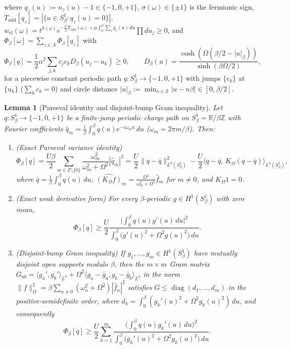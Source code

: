 \documentclass[11pt]{article}
\newtheorem{lemma}[theorem]{Lemma}
\theoremstyle{definition}
\theoremstyle{remark}
\DeclareMathOperator{\diag}{diag}
\newcommand{\R}{\mathbb{R}}
\newcommand{\Z}{\mathbb{Z}}
\begin{document}
where $q_z(u) := n_z(u) - 1 \in \{-1,0,+1\}$, $\sigma(\omega) \in \{\pm 1\}$ is
the fermionic sign, $T_{\mathrm{odd}}[q_z] = |\{u \in S^1_\beta : q_z(u) = 0\}|$,
$w_{\mathrm{el}}(\omega) = t^{h(\omega)} e^{-\frac{U}{2} T_{\mathrm{odd}}(\omega) + \mu \int_0^\beta \sum_z q_z(u)\,du}\prod du_j \ge 0$,
and $\Phi_\beta[\omega] = \sum_{z \in \Lambda} \Phi_\beta[q_z]$ with
\begin{equation}
\label{eq:cs-phi}
\Phi_\beta[q] = \frac{1}{2}\alpha^2 \sum_{j,k} c_j c_k D_\beta(u_j - u_k) \ge 0,
\qquad
D_\beta(u) = \frac{\cosh(\Omega(\beta/2 - |u|_\beta))}{\sinh(\beta\Omega/2)},
\end{equation}
for a piecewise constant periodic path $q: S^1_\beta \to \{-1,0,+1\}$ with jumps
$\{c_k\}$ at $\{u_k\}$ ($\sum_k c_k = 0$) and circle distance
$|u|_\beta := \min_{n \in \Z}|u - n\beta| \in [0,\beta/2]$.

\begin{lemma}[Parseval identity and disjoint-bump Gram inequality]
\label{lem:cs-gram}
Let $q: S^1_\beta \to \{-1,0,+1\}$ be a finite-jump periodic charge path on
$S^1_\beta = \R/\beta\Z$ with Fourier coefficients
$\hat{q}_m = \frac{1}{\beta}\int_0^\beta q(u) e^{-i\omega_m u}\,du$
($\omega_m = 2\pi m/\beta$). Then:
\begin{enumerate}[leftmargin=1.5em]
\item \emph{(Exact Parseval variance identity)}
\[
\Phi_\beta[q]
= \frac{U\beta}{2} \sum_{m \in \Z \setminus \{0\}}
  \frac{\omega_m^2}{\omega_m^2 + \Omega^2} |\hat{q}_m|^2
= \frac{U}{2} \|q - \bar{q}\|_{L^2(S^1_\beta)}^2
- \frac{U}{2} \langle q - \bar{q},\, K_\Omega (q - \bar{q})\rangle_{L^2(S^1_\beta)},
\]
where $\bar{q} = \frac{1}{\beta}\int_0^\beta q(u)\,du$,
$\widehat{(K_\Omega f)}_m = \frac{\Omega^2}{\omega_m^2 + \Omega^2}\hat{f}_m$
for $m \ne 0$, and $K_\Omega 1 = 0$.
\item \emph{(Exact weak derivative form)} For every $\beta$-periodic
$g \in H^1(S^1_\beta)$ with zero mean,
\begin{equation}
\label{eq:cs-parseval-h1}
\Phi_\beta[q]
\ge \frac{U}{2} \frac{\bigl|\int_0^\beta q(u) g'(u)\,du\bigr|^2}{\int_0^\beta \bigl(g'(u)^2 + \Omega^2 g(u)^2\bigr)\,du}.
\end{equation}
\item \emph{(Disjoint-bump Gram inequality)} If $g_1,\dots,g_m \in H^1(S^1_\beta)$
have mutually disjoint open supports modulo $\beta$, then the $m \times m$
Gram matrix $G_{ab} = \langle g_a', g_b'\rangle_{L^2} + \Omega^2 \langle g_a - \bar{g}_a, g_b - \bar{g}_b\rangle_{L^2}$
in the norm $\|f\|_{\Omega}^2 = \beta \sum_{n \ne 0}(\omega_n^2 + \Omega^2)|\hat{f}_n|^2$
satisfies $G \le \diag(d_1,\dots,d_m)$ in the positive-semidefinite order, where
$d_k = \int_0^\beta (g_k'(u)^2 + \Omega^2 g_k(u)^2)\,du$, and consequently
\[
\Phi_\beta[q]
\ge \frac{U}{2} \sum_{k=1}^m \frac{\bigl(\int_0^\beta q(u) g_k'(u)\,du\bigr)^2}{\int_0^\beta \bigl(g_k'(u)^2 + \Omega^2 g_k(u)^2\bigr)\,du}.
\]
\end{enumerate}
\end{lemma}
\end{document}
